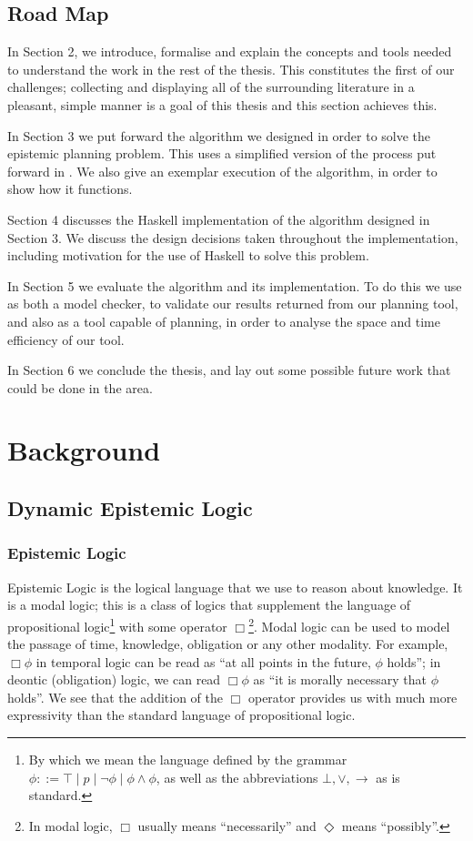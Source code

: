 \documentclass[10pt, a4paper]{report}
\begin{document}
\section{Road Map}

In Section 2, we introduce, formalise and explain the concepts and tools needed
to understand the work in the rest of the thesis. This constitutes the first of
our challenges; collecting and displaying all of the surrounding literature in a
pleasant, simple manner is a goal of this thesis and this section achieves this.

In Section 3 we put forward the algorithm we designed in order to solve the
epistemic planning problem. This uses a simplified version of the process put
forward in . We also give an exemplar execution of
the algorithm, in order to show how it functions.

Section 4 discusses the Haskell implementation of the algorithm designed in
Section 3. We discuss the design decisions taken throughout the implementation,
including motivation for the use of Haskell to solve this problem.

In Section 5 we evaluate the algorithm and its implementation. To do this we
use \cite{GithubGossip} as both a model checker, to validate our results
returned from our planning tool, and also as a tool capable of planning, in
order to analyse the space and time efficiency of our tool. 

In Section 6 we conclude the thesis, and lay out some possible future work that
could be done in the area. 

\newpage

\chapter{Background}

\section{Dynamic Epistemic Logic}
\label{sec:DEL}

\subsection{Epistemic Logic}

Epistemic Logic is the logical language that we use to reason about knowledge.
It is a modal logic; this is a class of logics that supplement the language of
propositional logic\footnote{By which we mean the language defined by the
  grammar $\phi ::= \top \mid p \mid \neg \phi \mid \phi \land \phi$, as well as
  the abbreviations $\bot, \lor, \rightarrow$ as is standard.} with some
operator $\Box$\footnote{In modal logic, $\Box$ usually means ``necessarily''
  and $\Diamond$ means ``possibly''.}. Modal logic can be used to model the
passage of time, knowledge, obligation or any other modality. For example, $\Box
\phi$ in temporal logic can be read as ``at all points in the future, $\phi$
holds''; in deontic (obligation) logic, we can read $\Box \phi$ as ``it is
morally necessary that $\phi$ holds''. We see that the addition of the $\Box$
operator provides us with much more expressivity than the standard language of
propositional logic.
\end{document}
